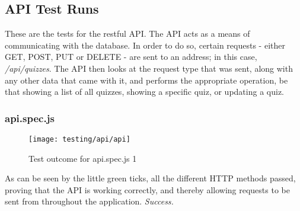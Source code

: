 \subsection{API Test Runs}
These are the tests for the restful API. The API acts as a means of communicating with the database. In order to do so, certain requests - either GET, POST, PUT or DELETE - are sent to an address; in this case, \textit{/api/quizzes}. The API then looks at the request type that was sent, along with any other data that came with it, and performs the appropriate operation, be that showing a list of all quizzes, showing a specific quiz, or updating a quiz.

\subsubsection{api.spec.js} %
\label{ssub:api_spec_js}

\begin{figure}[h!]
  \texttt{[image: testing/api/api]}
  \caption{Test outcome for api.spec.js 1}
\end{figure}

As can be seen by the little green ticks, all the different HTTP methods passed, proving that the API is working correctly, and thereby allowing requests to be sent from throughout the application. \textit{Success.}

